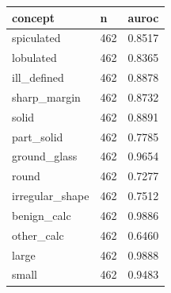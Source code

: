 \begin{tabular}{lll}
\hline
concept & n & auroc \\
\hline
spiculated & 462 & 0.8517 \\
lobulated & 462 & 0.8365 \\
ill\_defined & 462 & 0.8878 \\
sharp\_margin & 462 & 0.8732 \\
solid & 462 & 0.8891 \\
part\_solid & 462 & 0.7785 \\
ground\_glass & 462 & 0.9654 \\
round & 462 & 0.7277 \\
irregular\_shape & 462 & 0.7512 \\
benign\_calc & 462 & 0.9886 \\
other\_calc & 462 & 0.6460 \\
large & 462 & 0.9888 \\
small & 462 & 0.9483 \\
\hline
\end{tabular}
